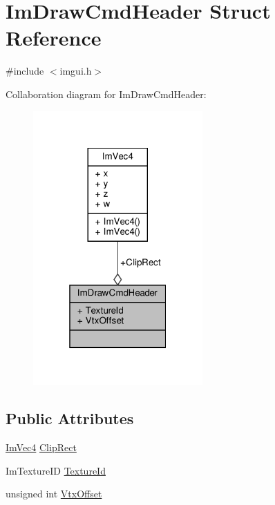 \hypertarget{structImDrawCmdHeader}{}\section{Im\+Draw\+Cmd\+Header Struct Reference}
\label{structImDrawCmdHeader}


{\ttfamily \#include $<$imgui.\+h$>$}



Collaboration diagram for Im\+Draw\+Cmd\+Header\+:
\nopagebreak
\begin{figure}[H]
\begin{center}
\leavevmode
\includegraphics[width=184pt]{structImDrawCmdHeader__coll__graph}
\end{center}
\end{figure}
\subsection*{Public Attributes}
\begin{DoxyCompactItemize}
\item 
\hyperlink{structImVec4}{Im\+Vec4} \hyperlink{structImDrawCmdHeader_a576deba50bb9b646ddee16d4fd096bf4}{Clip\+Rect}
\item 
Im\+Texture\+ID \hyperlink{structImDrawCmdHeader_a09a7455ca6cbce7e64b1604da08b9ad1}{Texture\+Id}
\item 
unsigned int \hyperlink{structImDrawCmdHeader_a88b7d50043b0a8b299aaa94a9a3cf121}{Vtx\+Offset}
\end{DoxyCompactItemize}


